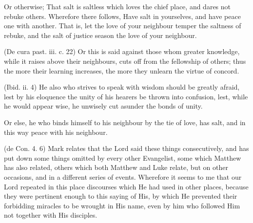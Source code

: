  Or otherwise; That salt is saltless which loves the chief place, and dares not rebuke others. Wherefore there follows, Have salt in yourselves, and have peace one with another. That is, let the love of your neighbour temper the saltness of rebuke, and the salt of justice season the love of your neighbour.

 (De cura past. iii. c. 22) Or this is said against those whom greater knowledge, while it raises above their neighbours, cuts off from the fellowship of others; thus the more their learning increases, the more they unlearn the virtue of concord.

 (Ibid. ii. 4) He also who strives to speak with wisdom should be greatly afraid, lest by his eloquence the unity of his hearers be thrown into confusion, lest, while he would appear wise, he unwisely cut asunder the bonds of unity.

 Or else, he who binds himself to his neighbour by the tie of love, has salt, and in this way peace with his neighbour.

 (de Con. 4. 6) Mark relates that the Lord said these things consecutively, and has put down some things omitted by every other Evangelist, some which Matthew has also related, others which both Matthew and Luke relate, but on other occasions, and in a different series of events. Wherefore it seems to me that our Lord repeated in this place discourses which He had used in other places, because they were pertinent enough to this saying of His, by which He prevented their forbidding miracles to be wrought in His name, even by him who followed Him not together with His disciples.


 

